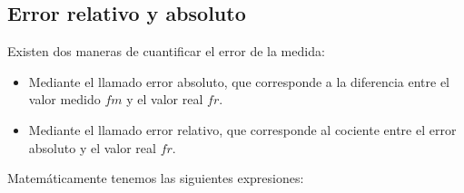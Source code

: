 \documentclass{article}
\begin{document}


   

     
     
     


\subsection{Error relativo y absoluto}

Existen dos maneras de cuantificar el error de la medida:\citep{ErrorEx}

\begin{itemize}
    \item  Mediante el llamado error absoluto, que corresponde a la diferencia entre el valor medido $fm$ y el valor real $fr$.
    \item Mediante el llamado error relativo, que corresponde al cociente entre el error absoluto y el valor real $fr$.\citep{ErrorEx}
\end{itemize}

   

Matemáticamente tenemos las siguientes expresiones:\citep{ErrorEx}\\
\end{document}
